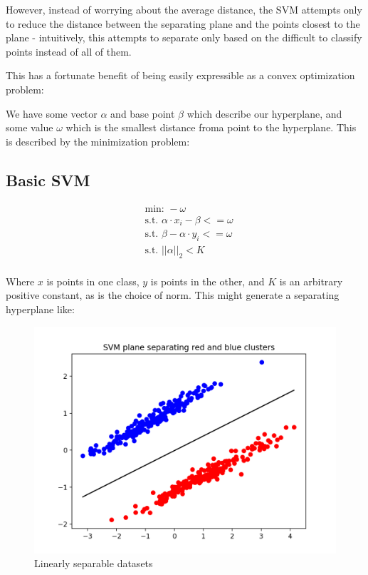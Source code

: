 \documentclass[]{article}
\begin{document}
However, instead of worrying about the average distance, the SVM attempts only to reduce the distance between
the separating plane and the points closest to the plane - intuitively, this attempts to separate only based on the difficult to classify points instead of all of them.

This has a fortunate benefit of being easily expressible as a convex optimization problem:

We have some vector $\alpha$ and base point $\beta$ which describe our hyperplane, and some value $\omega$ which is the smallest distance froma point to the hyperplane. This is described by the minimization problem:

\subsection{Basic SVM}

\begin{equation}
\begin{split}
&\text{min: } -\omega
\\
&\text{s.t. } \alpha \cdot x_i - \beta <= \omega
\\
&\text{s.t. } \beta - \alpha \cdot y_i <= \omega
\\
&\text{s.t. } ||\alpha||_2 < K
\\
\end{split}
\end{equation}

Where $x$ is points in one class, $y$ is points in the other, and $K$ is an arbitrary positive constant, as is the choice of norm. This might generate a separating hyperplane like:

\begin{figure}[H]
	\includegraphics[width=\linewidth]{svm_low_var.png}
	\caption{Linearly separable datasets}
\end{figure}
\end{document}
